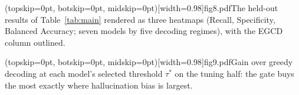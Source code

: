 \documentclass{ieeeaccess}
\begin{document}
\Figure[!ht](topskip=0pt, botskip=0pt, midskip=0pt)[width=0.98\columnwidth]{fig8.pdf}{The held-out results of Table~\ref{tab:main} rendered as three heatmaps (Recall, Specificity, Balanced Accuracy; seven models by five decoding regimes), with the EGCD column outlined.\label{fig:heatmap}}

\Figure[!ht](topskip=0pt, botskip=0pt, midskip=0pt)[width=0.98\columnwidth]{fig9.pdf}{Gain over greedy decoding at each model's selected threshold $\tau^{*}$ on the tuning half: the gate buys the most exactly where hallucination bias is largest.\label{fig:gain}}

\clearpage




\EOD
\end{document}
